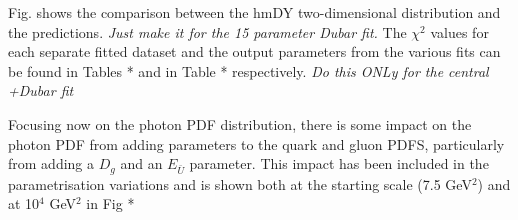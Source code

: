 Fig. shows the comparison between the hmDY two-dimensional distribution and the predictions. {\it Just make it for the 15 parameter Dubar fit.}
The $\chi^{2}$ values for each separate fitted dataset and the output parameters from the various fits can be found in Tables * %
and in Table *%
respectively. {\it Do this ONLy for the central +Dubar fit}

Focusing now on the photon PDF distribution, there is some impact on the photon PDF from adding parameters to the quark and gluon PDFS, particularly from adding a $D_g$ and an $E_{\bar{U}}$ parameter.
This impact has been included in the parametrisation variations and is shown 
both at the starting scale (7.5 GeV$^{2}$) and at 10$^{4}$ GeV$^{2}$ 
 in Fig *

